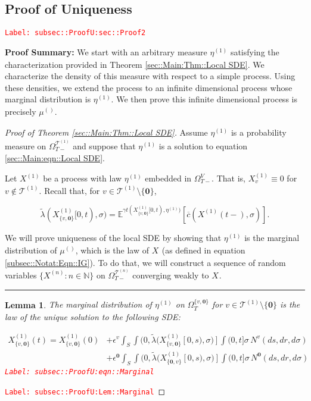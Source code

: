 \documentclass[12pt]{article}
\newcommand{\mb}{\mathbb}
\newcommand{\mc}{\mathcal}
\newcommand{\ov}{\overline}
\newcommand{\ep}{\epsilon}
\newcommand{\tr}{\textcolor{red}}
\newcommand{\labe}[1]{\tr{\texttt{Label: #1}}}
\newcommand{\pfsum}{\textbf{Proof Summary: }}
\newcommand{\ind}{\hspace{24pt}}
\newcommand{\lin}{\rule{\linewidth}{0.4 pt}}
\newcommand{\exmu}[2]{\mb{E}^{#1}\left[#2\right]}	%
\renewcommand{\root}{\mathbf{0}}				%
\renewcommand{\v}{v}							%
\renewcommand{\S}{S}							%
\newcommand{\s}{\sigma}							%
\newcommand{\ev}{\ep}							%
\newcommand{\T}{T}								%
\renewcommand{\t}{t}							%
\newcommand{\sset}{\Omega}						%
\renewcommand{\tt}{s}							%
\newcommand{\X}{X}								%
\newcommand{\vind}[1]{^{#1}}					%
\newcommand{\vsi}[1]{^{#1}}						%
\newcommand{\cind}[1]{_{#1}}					%
\newcommand{\tp}[1]{(#1)}						%
\newcommand{\tip}[1]{#1}						%
\newcommand{\ts}[1]{_{#1}}						%
\newcommand{\IGrg}{\ov{c}}						%
\newcommand{\tree}{\mc{T}}						%
\newcommand{\sln}[1]{^{(#1)}}						%
\newcommand{\poiss}{N}							%
\renewcommand{\r}{r}							%
\newcommand{\alt}[1]{\widetilde{#1}}			%
\newcommand{\m}{\mu}							%
\newcommand{\mmm}{\eta}							%
\newcommand{\cm}{\gamma}						%
\newcommand{\crate}{\alt{\lambda}}				%
\newtheorem{lem}[thms]{Lemma}
\begin{document}
\subsection{Proof of Uniqueness}
\label{subsec::ProofU:sec::Proof2}\labe{subsec::ProofU:sec::Proof2}

\pfsum We start with an arbitrary measure \(\mmm\sln{1}\ts{}\) satisfying the characterization provided in Theorem \ref{sec::Main:Thm::Local SDE}. We characterize the density of this measure with respect to a simple process. Using these densities, we extend the process to an infinite dimensional process whose marginal distribution is \(\mmm\sln{1}\ts{}\). We then prove this infinite dimensional process is precisely \(\m\sln{}\ts{}\).

\begin{proof}[Proof of Theorem \ref{sec::Main:Thm::Local SDE}]

Assume \(\mmm\sln{1}\ts{}\) is a probability measure on \(\sset\vsi{\tree\sln{1}}\ts{\T-}\) and suppose that \(\mmm\sln{1}\ts{}\) is a solution to equation \eqref{sec::Main:eqn::Local SDE}.

\ind Let \(\X\sln{1}\cind{}\tip{}\) be a process with law \(\mmm\sln{1}\ts{}\) embedded in \(\sset\vsi{V}\ts{\T-}\). That is, \(\X\sln{1}\cind{\v}\tip{} \equiv 0\) for \(\v \notin \tree\sln{1}\). Recall that, for \(\v \in \tree\sln{1}\setminus\{\root\}\),

\[\crate{}{}(\X\sln{1}\cind{\{\v,\root\}}\tip{[0,\t)},\s) = \exmu{\cm{\t}(\X\sln{1}\cind{\{\v,\root\}}\tip{[0,\t)},\mmm\sln{1}\ts{})}{\IGrg{}(\X\sln{1}\cind{}\tp{\t-},\s)}.\]

\ind We will prove uniqueness of the local SDE by showing that \(\mmm\sln{1}\ts{}\) is the marginal distribution of \(\m\sln{}\ts{}\), which is the law of \(\X\cind{}\tip{}\) (as defined in equation \eqref{subsec::Notat:Eqn::IG}). To do that, we will construct a sequence of random variables \(\{\X\sln{n}\cind{}\tip{}:n\in\mb{N}\}\) on \(\sset\vsi{\tree\sln{n}}\ts{\T-}\) converging weakly to \(\X\cind{}\tip{}\). 

\lin

\begin{lem}
The marginal distribution of \(\mmm\sln{1}\ts{}\) on \(\sset\vsi{\{\v,\root\}}\ts{\T}\) for \(\v \in \tree\sln{1}\setminus\{\root\}\) is the law of the unique solution to the following SDE:

\begin{align}
\X\sln{1}\cind{\{\v,\root\}}\tp{\t} = \X\sln{1}\cind{\{\v,\root\}}\tp{0} &+ \ev\vind{\v}\int_\S\int{(0,\crate{}{}(\X\sln{1}\cind{\{\v,\root\}}\tip{[0,\tt)},\s)]}\int{(0,\t]}\s\,\poiss\vind{\v}(d\tt,d\r,d\s)\nonumber\\
&+ \ev\vind{\root}\int_\S\int{(0,\crate{}{}(\X\sln{1}\cind{\{\root,\v\}}\tip{[0,\tt)},\s)]}\int{(0,\t]}\s\,\poiss\vind{\root}(d\tt,d\r,d\s)
\label{subsec::ProofU:eqn::Marginal}
\end{align}
\labe{subsec::ProofU:eqn::Marginal}
\label{subsec::ProofU:Lem::Marginal}
\end{lem}
\labe{subsec::ProofU:Lem::Marginal}


\end{proof}
\end{document}
